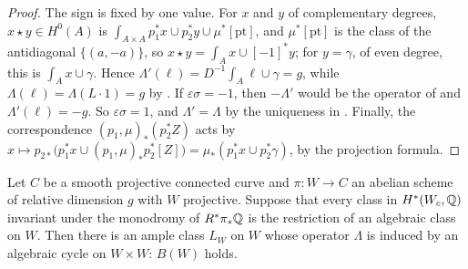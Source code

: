 \begin{proof}
The sign is fixed by one value. For $x$ and $y$ of complementary degrees,
$x\star y\in H^{0}(A)$ is $\int_{A\times A}p_{1}^{*}x\cup p_{2}^{*}y\cup
\mu^{*}[\mathrm{pt}]$, and $\mu^{*}[\mathrm{pt}]$ is the class of the
antidiagonal $\{(a,-a)\}$, so $x\star y=\int_{A}x\cup[-1]^{*}y$; for
$y=\gamma$, of even degree, this is $\int_{A}x\cup\gamma$. Hence
$\Lambda'(\ell)=D^{-1}\int_{A}\ell\cup\gamma=g$, while
$\Lambda(\ell)=\Lambda(L\cdot1)=g$ by . If
$\varepsilon\sigma=-1$, then $-\Lambda'$ would be the operator of
 and $\Lambda'(\ell)=-g$. So $\varepsilon\sigma=1$, and
$\Lambda'=\Lambda$ by the uniqueness in . Finally, the
correspondence $(p_{1},\mu)_{*}(p_{2}^{*}Z)$ acts by
$x\mapsto p_{2*}\bigl(p_{1}^{*}x\cup(p_{1},\mu)_{*}p_{2}^{*}[Z]\bigr)
=\mu_{*}(p_{1}^{*}x\cup p_{2}^{*}\gamma)$, by the projection formula.
\end{proof}

\begin{theorem}
\label{thm:lefschetzfamily}
Let $C$ be a smooth projective connected curve and $\pi\colon W\to C$ an
abelian scheme of relative dimension $g$ with $W$ projective. Suppose that
every class in $H^{*}(W_{c},\mathbb{Q})$ invariant under the monodromy of
$R^{*}\pi_{*}\mathbb{Q}$ is the restriction of an algebraic class on $W$. Then there
is an ample class $L_{W}$ on $W$ whose operator $\Lambda$ is induced by an
algebraic cycle on $W\times W$: $B(W)$ holds.
\end{theorem}

